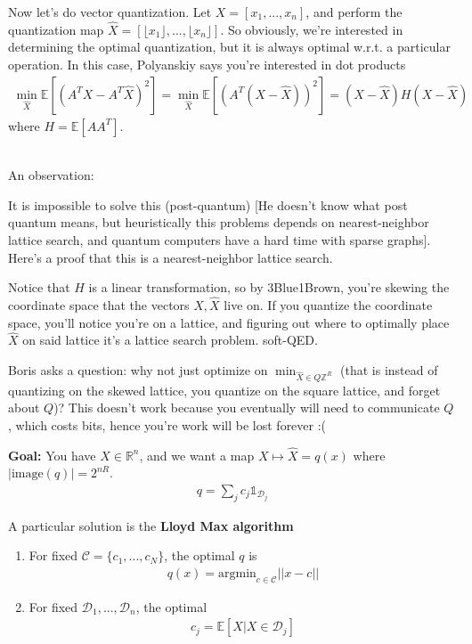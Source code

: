 Now let's do vector quantization. Let $X = [x_1, ..., x_n]$, and perform the quantization map $\hat X = [\lfloor x_1 \rfloor, ..., \lfloor x_n \rfloor]$. So obviously, we're interested in determining the optimal quantization, but it is always optimal w.r.t. a particular operation. In this case, Polyanskiy says you're interested in dot products
\begin{align}
	\min_{\hat X} \mathbb E[(A^T X - A^T \hat X)^2] = \min_{\hat X} \mathbb E[(A^T (X - \hat X))^2] = (X - \hat X) H (X - \hat X)
\end{align}
where $H = \mathbb E[AA^T]$.\\
\\
\begin{sidework}
An observation:

It is impossible to solve this (post-quantum) [He doesn't know what post quantum means, but heuristically this problems depends on nearest-neighbor lattice search, and quantum computers have a hard time with sparse graphs]. Here's a proof that this is a nearest-neighbor lattice search.

	Notice that $H$ is a linear transformation, so by 3Blue1Brown, you're skewing the coordinate space that the vectors $X,\hat X$ live on. If you quantize the coordinate space, you'll notice you're on a lattice, and figuring out where to optimally place $\hat X$ on said lattice it's a lattice search problem. soft-QED.
\end{sidework}

\begin{sidework}
	Boris asks a question: why not just optimize on $\min_{\hat X \in Q \mathbb Z^R}$ (that is instead of quantizing on the skewed lattice, you quantize on the square lattice, and  forget about $Q$)? This doesn't work because you eventually will need to communicate $Q$, which costs bits, hence you're work will be lost forever :(
\end{sidework}
\textbf{Goal:} You have $X \in \mathbb R^n$, and we want a map $X \mapsto \hat X = q(x)$ where $|\text{image}(q)| = 2^{nR}$.
\begin{align}
	q = \sum_j c_j \mathds  1_{\mathcal D_j}
\end{align}

A particular solution is the \textbf{Lloyd Max algorithm}
\begin{enumerate}
	\item For fixed $\mathcal C = \{c_1, ..., c_N\}$, the optimal $q$ is
		\begin{align}
			q(x) = \text{argmin}_{c \in \mathcal C}  ||x - c||
		\end{align}
	\item For fixed $\mathcal D_1 ,..., \mathcal D_n$, the optimal 
		\begin{align}
			c_j = \mathbb E[X | X\in \mathcal D_j]
		\end{align}
\end{enumerate}


